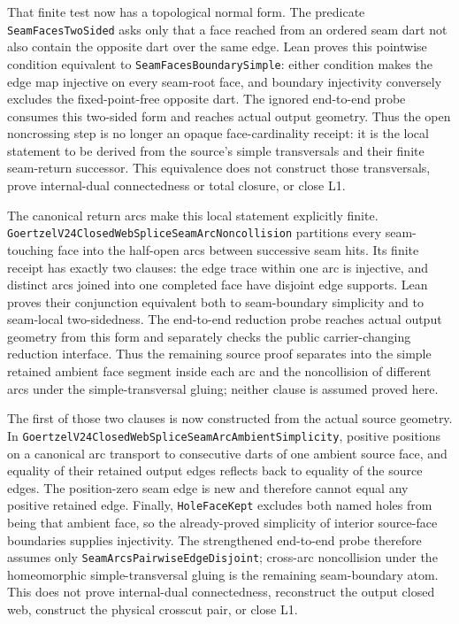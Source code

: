 \documentclass[11pt]{article}
\theoremstyle{definition}
\begin{document}
That finite test now has a topological normal form.  The predicate
\texttt{SeamFacesTwoSided} asks only that a face reached from an ordered seam
dart not also contain the opposite dart over the same edge.  Lean proves this
pointwise condition equivalent to \texttt{SeamFacesBoundarySimple}: either
condition makes the edge map injective on every seam-root face, and boundary
injectivity conversely excludes the fixed-point-free opposite dart.  The
ignored end-to-end probe consumes this two-sided form and reaches actual output
geometry.  Thus the open noncrossing step is no longer an opaque
face-cardinality receipt: it is the local statement to be derived from the
source's simple transversals and their finite seam-return successor.  This
equivalence does not construct those transversals, prove internal-dual
connectedness or total closure, or close L1.

The canonical return arcs make this local statement explicitly finite.
\texttt{GoertzelV24ClosedWebSpliceSeamArcNoncollision} partitions every
seam-touching face into the half-open arcs between successive seam hits.  Its
finite receipt has exactly two clauses: the edge trace within one arc is
injective, and distinct arcs joined into one completed face have disjoint edge
supports.  Lean proves their conjunction equivalent both to seam-boundary
simplicity and to seam-local two-sidedness.  The end-to-end reduction probe
reaches actual output geometry from this form and separately checks the public
carrier-changing reduction interface.
Thus the remaining source proof separates into the simple retained ambient
face segment inside each arc and the noncollision of different arcs under the
simple-transversal gluing; neither clause is assumed proved here.

The first of those two clauses is now constructed from the actual source
geometry.  In
\texttt{GoertzelV24ClosedWebSpliceSeamArcAmbientSimplicity}, positive positions
on a canonical arc transport to consecutive darts of one ambient source face,
and equality of their retained output edges reflects back to equality of the
source edges.  The position-zero seam edge is new and therefore cannot equal
any positive retained edge.  Finally, \texttt{HoleFaceKept} excludes both
named holes from being that ambient face, so the already-proved simplicity of
interior source-face boundaries supplies injectivity.  The strengthened
end-to-end probe therefore assumes only
\texttt{SeamArcsPairwiseEdgeDisjoint}; cross-arc noncollision under the
homeomorphic simple-transversal gluing is the remaining seam-boundary atom.
This does not prove internal-dual connectedness, reconstruct the output closed
web, construct the physical crosscut pair, or close L1.
\end{document}
